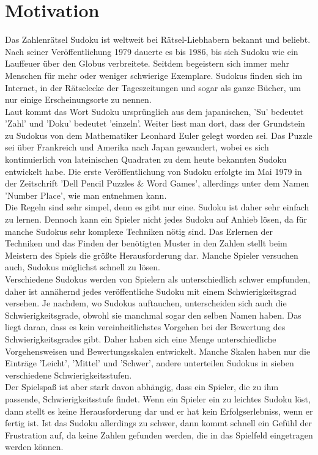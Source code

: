 \section{Motivation}
Das Zahlenrätsel Sudoku ist weltweit bei Rätsel-Liebhabern bekannt und beliebt. Nach seiner Veröffentlichung 1979 dauerte es bis 1986, bis sich Sudoku wie ein Lauffeuer über den Globus verbreitete. Seitdem begeistern sich immer mehr Menschen für mehr oder weniger schwierige Exemplare. Sudokus finden sich im Internet, in der Rätselecke der Tageszeitungen und sogar als ganze Bücher, um nur einige Erscheinungsorte zu nennen. \\
Laut \cite{SuDra:2014:Misc} kommt das Wort Sudoku ursprünglich aus dem japanischen, 'Su' bedeutet 'Zahl' und 'Doku' bedeutet 'einzeln'. Weiter liest man dort, dass der Grundstein zu Sudokus von dem Mathematiker Leonhard Euler gelegt worden sei. Das Puzzle sei über Frankreich und Amerika nach Japan gewandert, wobei es sich kontinuierlich von lateinischen Quadraten \cite{latq} zu dem heute bekannten Sudoku entwickelt habe. Die erste Veröffentlichung von Sudoku erfolgte im Mai 1979 in der Zeitschrift 'Dell Pencil Puzzles \& Word Games', allerdings unter dem Namen 'Number Place', wie man \cite{Wolf2014} entnehmen kann.\\
Die Regeln sind sehr simpel, denn es gibt nur eine. Sudoku ist daher sehr einfach zu lernen. Dennoch kann ein Spieler nicht jedes Sudoku auf Anhieb lösen, da für manche Sudokus sehr komplexe Techniken nötig sind. Das Erlernen der Techniken und das Finden der benötigten Muster in den Zahlen stellt beim Meistern des Spiels die größte Herausforderung dar. Manche Spieler versuchen auch, Sudokus möglichst schnell zu lösen.\\
Verschiedene Sudokus werden von Spielern als unterschiedlich schwer empfunden, daher ist annähernd jedes veröffentliche Sudoku mit einem Schwierigkeitsgrad versehen. Je nachdem, wo Sudokus auftauchen, unterscheiden sich auch die Schwierigkeitsgrade, obwohl sie manchmal sogar den selben Namen haben. Das liegt daran, dass es kein vereinheitlichstes Vorgehen bei der Bewertung des Schwierigkeitsgrades gibt. Daher haben sich eine Menge unterschiedliche Vorgehensweisen und Bewertungsskalen entwickelt. Manche Skalen haben nur die Einträge 'Leicht', 'Mittel' und 'Schwer', andere unterteilen Sudokus in sieben verschiedene Schwierigkeitsstufen.\\
Der Spielspaß ist aber stark davon abhängig, dass ein Spieler, die zu ihm passende, Schwierigkeitsstufe findet. Wenn ein Spieler ein zu leichtes Sudoku löst, dann stellt es keine Herausforderung dar und er hat kein Erfolgserlebniss, wenn er fertig ist. Ist das Sudoku allerdings zu schwer, dann kommt schnell ein Gefühl der Frustration auf, da keine Zahlen gefunden werden, die in das Spielfeld eingetragen werden können.\\
